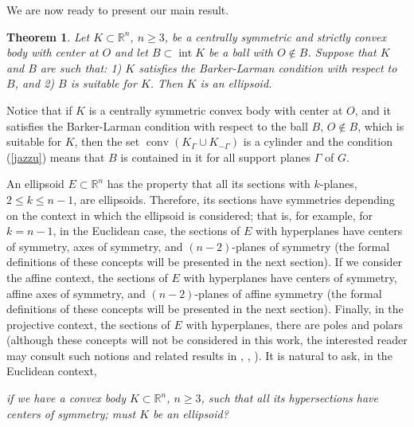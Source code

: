 \documentclass[12pt]{amsart}
\newcommand{\inte}{\operatorname*{int}}
\newcommand{\conv}{\operatorname*{conv}}
\newcommand{\Rn}{\mathbb{R}^{n}}
\newtheorem{theorem}{Theorem}
\begin{document}
                   We are now ready to present our main result.
                   
\begin{theorem}\label{mozart}
                  Let $K\subset \mathbb{R}^n$, $n\geq3 $, be a centrally symmetric and strictly 
                  convex body with center at $O$ and let $B\subset \inte K$ be a ball with $O\notin B$. 
                  Suppose that $K$ and $B$ are such that: 1) $K$ satisfies the Barker-Larman condition 
                  with respect to $B$, and 2) $B$ is suitable for $K$. Then $K$ is an ellipsoid.
\end{theorem}
                  Notice that if $K$ is a centrally symmetric convex body with center at $O$, and it 
                  satisfies the Barker-Larman condition with respect to the ball $B$, $O\notin B$, 
                  which is suitable for $K$, then the set $\conv (K_{\Gamma} \cup K_{-\Gamma})$ is 
                  a cylinder and  the condition (\ref{jazzu}) means that $B$ is contained in it for all 
                  support planes $\Gamma$ of $G$. 
                  
                  
                     An ellipsoid $E\subset \Rn$ has the property that all its sections with $k$-planes, 
                     $2\leq k\leq n-1$, are ellipsoids. Therefore, its sections have symmetries depending on 
                     the context in which the ellipsoid is considered; that is, for example, for $k=n-1$, in 
                     the Euclidean case, the sections of $E$ with hyperplanes have centers of symmetry, 
                     axes of symmetry, and $(n-2)$-planes of symmetry (the formal definitions of these 
                     concepts will be presented in the next section). If we consider the affine context, the 
                     sections of $E$ with hyperplanes have centers of symmetry, affine axes of symmetry, 
                     and $(n-2)$-planes of affine symmetry (the formal definitions of these concepts will be 
                     presented in the next section). Finally, in the projective context, the sections of $E$ 
                     with hyperplanes, there are poles and polars (although these concepts will not be 
                     considered in this work, the interested reader may consult such notions and related 
                     results in \cite{Kelly},  \cite{MM1}, \cite{larmanmorales}). It is natural to ask, in the 
                     Euclidean context, 
                     
                     \textit{if we have a convex body $K\subset \Rn$, $n\geq 3$, such that all its 
                     hypersections have centers of symmetry; must $K$ be an ellipsoid?} 
                     
\end{document}
